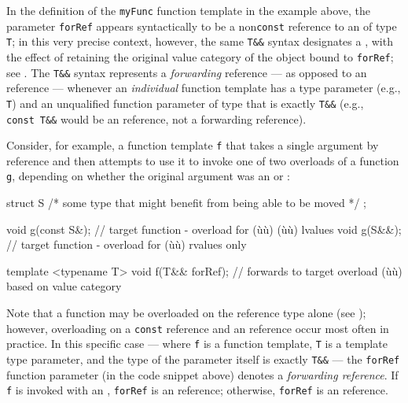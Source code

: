 \noindent In the definition of the \lstinline!myFunc! function template in the example above, the
parameter \lstinline!forRef! appears syntactically to be a
non\lstinline!const! reference to an  of type \lstinline!T!; in
this very precise context, however, the same \lstinline!T&&! syntax
designates a , with the effect of retaining
the original value category of the object bound to \lstinline!forRef!; see . 
The \lstinline!T&&! syntax
represents a \emph{forwarding} reference --- as opposed to an
 reference --- whenever an \emph{individual} function template has a type parameter (e.g., \lstinline!T!) and
an unqualified function parameter of type that is exactly
\lstinline!T&&! (e.g., \lstinline!const!~\lstinline!T&&! would be an
 reference, not a forwarding reference).

Consider, for example, a function template \lstinline!f! that takes a single
argument by reference and then attempts to use it to invoke one of two
overloads of a function \lstinline!g!, depending on whether the original
argument was an  or :

\begin{emcppslisting}[emcppsbatch=e1]
struct S { /* some type that might benefit from being able to be moved */ };

void g(const S&);   // target function - overload for (ù{}ù) (ù{}ù) lvalues
void g(S&&);        // target function - overload for (ù{}ù) rvalues only

template <typename T>
void f(T&& forRef); // forwards to target overload (ù{}ù) based on value category
\end{emcppslisting}

\noindent Note that a function may be overloaded on the reference type alone (see ); however, overloading on a \lstinline!const!  reference and an  reference occur most often in practice.
In this specific case --- where \lstinline!f! is a function template,
\lstinline!T! is a template type parameter, and the type of the parameter
itself is exactly \lstinline!T&&! --- the \lstinline!forRef! function
parameter (in the code snippet above) denotes a \emph{forwarding reference}. If \lstinline!f!\label{f-invoked-example}
is invoked with an , \lstinline!forRef! is an 
reference; otherwise, \lstinline!forRef! is an  reference.

